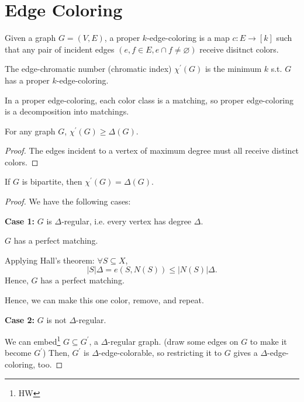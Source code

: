 \section{Edge Coloring}
\begin{definition}
    Given a graph \(G = (V, E)\), a proper \(k\)-edge-coloring is a map \(c: E \to [k]\) such that any pair of incident edges \((e, f \in E, e \cap f \neq \varnothing)\) receive disitnct colors.    
\end{definition}

\begin{definition}
    The edge-chromatic number (chromatic index) \(\chi ^{\prime} (G)\) is the minimum \(k\) s.t. \(G\) has a proper \(k\)-edge-coloring.    
\end{definition}

\begin{observation}
    In a proper edge-coloring, each color class is a matching, so proper edge-coloring is a decomposition into matchings.
\end{observation}

\begin{proposition}
    For any graph \(G\), \(\chi ^{\prime} (G) \ge \Delta (G)\).  
\end{proposition}

\begin{proof}
    The edges incident to a vertex of maximum degree must all receive distinct colors. 
\end{proof}

\begin{theorem}[Konig]
    If \(G\) is bipartite, then \(\chi ^{\prime} (G) = \Delta (G)\).  
\end{theorem}

\begin{proof}
    We have the following cases:

    \textbf{Case 1:} \(G\) is \(\Delta \)-regular, i.e. every vertex has degree \(\Delta\). 

    \begin{claim}
        \(G\) has a perfect matching. 
    \end{claim}    

    \begin{explanation}
        Applying Hall's theorem: \(\forall S \subseteq X\),
        \[
            \vert S \vert \Delta = e(S, N(S)) \le \vert N(S) \vert \Delta.  
        \] 
        Hence, \(G\) has a perfect matching. 
    \end{explanation}

    Hence, we can make this one color, remove, and repeat. 

    \textbf{Case 2:} \(G\) is not \(\Delta \)-regular. 

    We can embed\footnote{HW} \(G \subseteq G^{\prime}\), a \(\Delta \)-regular graph. (draw some edges on \(G\) to make it become \(G^{\prime}\)) Then, \(G^{\prime} \) is \(\Delta \)-edge-colorable, so restricting it to \(G\) gives a \(\Delta \)-edge-coloring, too.       
\end{proof}


